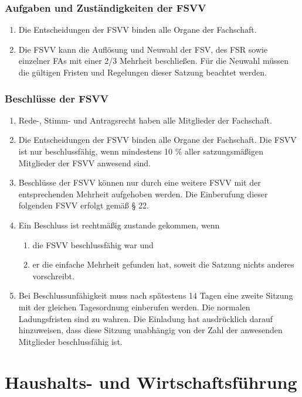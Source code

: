 \documentclass{article}
\begin{document}
\section{Aufgaben und Zuständigkeiten der FSVV}
\begin{enumerate}[(1)]
    \item Die Entscheidungen der FSVV binden alle Organe der Fachschaft.
	\item Die FSVV kann die Auflösung und Neuwahl der FSV, des FSR sowie einzelner FAs mit einer 2/3 Mehrheit beschließen. Für die Neuwahl müssen die gültigen Fristen und Regelungen dieser Satzung beachtet werden.
\end{enumerate}

\section{Beschlüsse der FSVV}

\begin{enumerate}[(1)]
	\item Rede-, Stimm- und Antragsrecht haben alle Mitglieder der Fachschaft.
	\item Die Entscheidungen der FSVV binden alle Organe der Fachschaft. Die FSVV ist nur beschlussfähig, wenn mindestens 10 \% aller satzungsmäßigen Mitglieder der FSVV anwesend sind.
	\item Beschlüsse der FSVV können nur durch eine weitere FSVV mit der entsprechenden Mehrheit aufgehoben werden. Die Einberufung dieser folgenden FSVV erfolgt gemäß § 22.
	\item Ein Beschluss ist rechtmäßig zustande gekommen, wenn
	\begin{enumerate}[1.]
		\item die FSVV beschlussfähig war und
		\item er die einfache Mehrheit gefunden hat, soweit die Satzung nichts anderes vorschreibt.
	\end{enumerate}
	\item Bei Beschlussunfähigkeit muss nach spätestens 14 Tagen eine zweite Sitzung mit der gleichen Tagesordnung einberufen werden. Die normalen Ladungsfristen sind zu wahren. Die Einladung hat ausdrücklich darauf hinzuweisen, dass diese Sitzung unabhängig von der Zahl der anwesenden Mitglieder beschlussfähig ist.
\end{enumerate}

\part{Haushalts- und Wirtschaftsführung}
\end{document}
